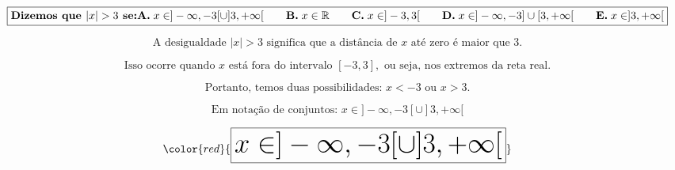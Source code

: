

\[
\boxed{\textbf{Dizemos que } |x| > 3 \textbf{ se:} \\
\\
\textbf{A.} \; x \in ] -\infty, -3[ \cup ]3, +\infty[ 
\quad\quad
\textbf{B.} \; x \in \mathbb{R} 
\quad\quad
\textbf{C.} \; x \in ] -3, 3[ 
\quad\quad
\textbf{D.} \; x \in ] -\infty, -3] \cup [3, +\infty[ 
\quad\quad
\textbf{E.} \; x \in ]3, +\infty[ }
\]





\[
\text{A desigualdade } |x| > 3 \text{ significa que a distância de } x \text{ até zero é maior que 3.}
\]





\[
\text{Isso ocorre quando } x \text{ está fora do intervalo } [-3, 3], \text{ ou seja, nos extremos da reta real.}
\]





\[
\text{Portanto, temos duas possibilidades: } x < -3 \text{ ou } x > 3.
\]





\[
\text{Em notação de conjuntos: } x \in ] -\infty, -3[ \cup ]3, +\infty[
\]





\[
\color{red}{\Huge \boxed{x \in ] -\infty, -3[ \cup ]3, +\infty[}}
\]


